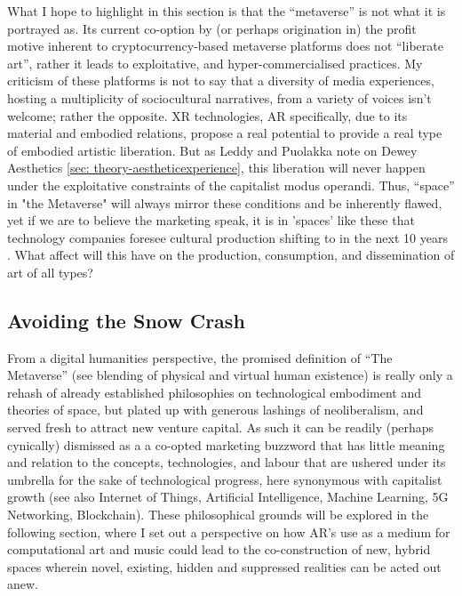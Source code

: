 What I hope to highlight in this section is that the “metaverse” is not what it is portrayed as. Its current co-option by (or perhaps origination in) the profit motive inherent to cryptocurrency-based metaverse platforms does not “liberate art”, rather it leads to exploitative, and hyper-commercialised practices. My criticism of these platforms is not to say that a diversity of media experiences, hosting a multiplicity of sociocultural narratives, from a variety of voices isn’t welcome; rather the opposite. XR technologies, AR specifically, due to its material and embodied relations, propose a real potential to provide a real type of embodied artistic liberation. But as Leddy and Puolakka note on Dewey Aesthetics \autoref{sec: theory-aestheticexperience}, this liberation will never happen under the exploitative constraints of the capitalist modus operandi. Thus, “space” in "the Metaverse" will always mirror these conditions and be inherently flawed, yet if we are to believe the marketing speak, it is in 'spaces' like these that technology companies foresee cultural production shifting to in the next 10 years \citep[]{fatemi2022}. What affect will this have on the production, consumption, and dissemination of art of all types?

\subsection{Avoiding the Snow Crash}\label{sec: theory-space-avoidingsnowcrash}
From a digital humanities perspective, the promised definition of “The Metaverse” (see blending of physical and virtual human existence) is really only a rehash of already established philosophies on technological embodiment and theories of space, but plated up with generous lashings of neoliberalism, and served fresh to attract new venture capital. As such it can be readily (perhaps cynically) dismissed as a a co-opted marketing buzzword that has little meaning and relation to the concepts, technologies, and labour that are ushered under its umbrella for the sake of technological progress, here synonymous with capitalist growth (see also Internet of Things, Artificial Intelligence, Machine Learning, 5G Networking, Blockchain). These philosophical grounds will be explored in the following section, where I set out a perspective on how AR’s use as a medium for computational art and music could lead to the co-construction of new, hybrid spaces wherein novel, existing, hidden and suppressed realities can be acted out anew. 

